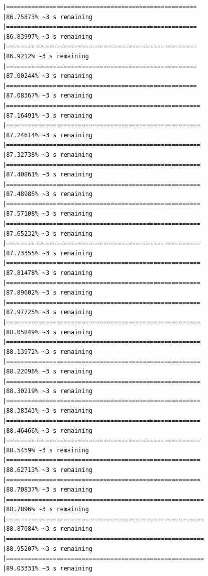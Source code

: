 \documentclass{article}\usepackage[]{graphicx}\usepackage[]{xcolor}
\makeatletter
\newenvironment{kframe}{%
 \def\at@end@of@kframe{}%
 \ifinner\ifhmode%
  \def\at@end@of@kframe{\end{minipage}}%
  \begin{minipage}{\columnwidth}%
 \fi\fi%
 \def\FrameCommand##1{\hskip\@totalleftmargin \hskip-\fboxsep
 \colorbox{shadecolor}{##1}\hskip-\fboxsep
     \hskip-\linewidth \hskip-\@totalleftmargin \hskip\columnwidth}%
 \MakeFramed {\advance\hsize-\width
   \@totalleftmargin\z@ \linewidth\hsize
   \@setminipage}}%
 {\par\unskip\endMakeFramed%
 \at@end@of@kframe}
\newenvironment{knitrout}{}{} %
\makeatother
\begin{document}
\begin{knitrout}
\begin{kframe}
\begin{verbatim}
|=====================================================         |86.75873% ~3 s remaining  
|=====================================================         |86.83997% ~3 s remaining  
|=====================================================         |86.9212% ~3 s remaining   
|=====================================================         |87.00244% ~3 s remaining  
|=====================================================         |87.08367% ~3 s remaining  
|======================================================        |87.16491% ~3 s remaining  
|======================================================        |87.24614% ~3 s remaining  
|======================================================        |87.32738% ~3 s remaining  
|======================================================        |87.40861% ~3 s remaining  
|======================================================        |87.48985% ~3 s remaining  
|======================================================        |87.57108% ~3 s remaining  
|======================================================        |87.65232% ~3 s remaining  
|======================================================        |87.73355% ~3 s remaining  
|======================================================        |87.81478% ~3 s remaining  
|======================================================        |87.89602% ~3 s remaining  
|======================================================        |87.97725% ~3 s remaining  
|======================================================        |88.05849% ~3 s remaining  
|======================================================        |88.13972% ~3 s remaining  
|======================================================        |88.22096% ~3 s remaining  
|======================================================        |88.30219% ~3 s remaining  
|======================================================        |88.38343% ~3 s remaining  
|======================================================        |88.46466% ~3 s remaining  
|======================================================        |88.5459% ~3 s remaining   
|======================================================        |88.62713% ~3 s remaining  
|======================================================        |88.70837% ~3 s remaining  
|=======================================================       |88.7896% ~3 s remaining   
|=======================================================       |88.87084% ~3 s remaining  
|=======================================================       |88.95207% ~3 s remaining  
|=======================================================       |89.03331% ~3 s remaining  

\end{verbatim}
\end{kframe}
\end{knitrout}
\end{document}
